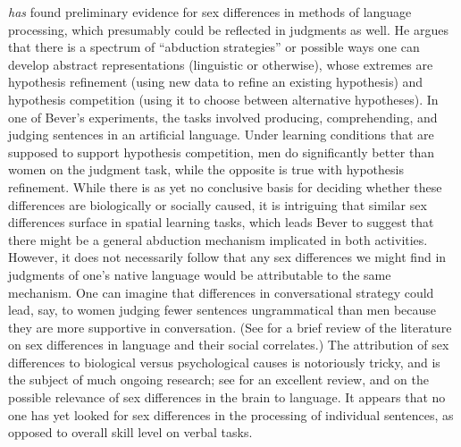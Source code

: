 \textit{has} found preliminary evidence for sex differences in methods of language processing, which presumably could be reflected in judgments as well. He argues that there is a spectrum of ``abduction strategies'' or possible ways one can develop abstract representations (linguistic or otherwise), whose extremes are hypothesis refinement (using new data to refine an existing hypothesis) and hypothesis competition (using it to choose between alternative hypotheses). In one of Bever's experiments, the tasks involved producing, comprehending, and judging sentences in an artificial language. Under learning conditions that are supposed to support hypothesis competition, men do significantly better than women on the judgment task, while the opposite is true with hypothesis refinement. While there is as yet no conclusive basis for deciding whether these differences are biologically or socially caused, it is intriguing that similar sex differences surface in spatial learning tasks, which leads Bever to suggest that there might be a general abduction mechanism implicated in both activities. However, it does not necessarily follow that any sex differences we might find in judgments of one's native language would be attributable to the same mechanism. One can imagine that differences in conversational strategy could lead, say, to women judging fewer sentences ungrammatical than men because they are more supportive in conversation. (See \citet[ch. 13]{Wardhaugh1988} for a brief review of the literature on sex differences in language and their social correlates.) The attribution of sex differences to biological versus psychological causes is notoriously tricky, and is the subject of much ongoing research; see \citet{Halpern1992} for an excellent review, and \citet{PhilipsEtAl1987} on the possible relevance of sex differences in the brain to language. It appears that no one has yet looked for sex differences in the processing of individual sentences, as opposed to overall skill level on verbal tasks.

